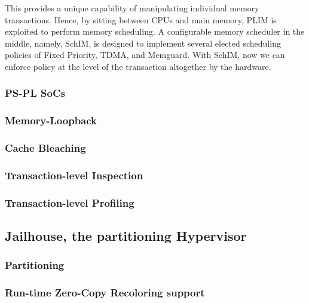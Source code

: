     This provides a unique capability of manipulating individual memory transactions. Hence, by sitting between CPUs and main memory, PLIM is exploited to perform memory scheduling. A configurable memory scheduler in the middle, namely, SchIM, is designed to implement several elected scheduling policies of Fixed Priority, TDMA, and Memguard. With
    SchIM, now we can enforce policy at the level of the transaction altogether by the hardware.



\subsubsection{PS-PL SoCs}
\subsubsection{Memory-Loopback}
\subsubsection{Cache Bleaching}
\subsubsection{Transaction-level Inspection}
\subsubsection{Transaction-level Profiling}

\subsection{Jailhouse, the partitioning Hypervisor}
\subsubsection{Partitioning}
        \subsubsection{Run-time Zero-Copy Recoloring support}

